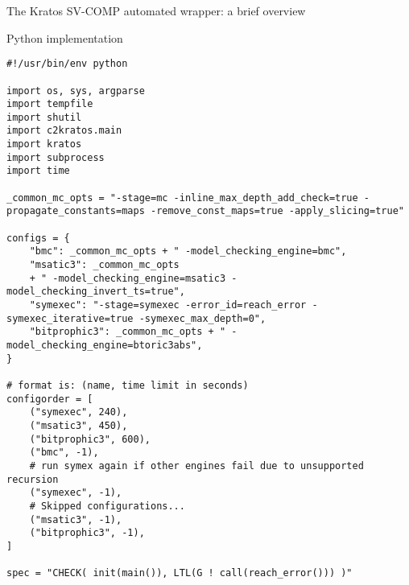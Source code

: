 \begin{frame}[fragile]{The Kratos SV-COMP automated wrapper: a brief overview}
    \begin{block}{Python implementation}
            \begin{verbatim}
#!/usr/bin/env python

import os, sys, argparse
import tempfile
import shutil
import c2kratos.main
import kratos
import subprocess
import time

_common_mc_opts = "-stage=mc -inline_max_depth_add_check=true -propagate_constants=maps -remove_const_maps=true -apply_slicing=true"

configs = {
    "bmc": _common_mc_opts + " -model_checking_engine=bmc",
    "msatic3": _common_mc_opts
    + " -model_checking_engine=msatic3 -model_checking_invert_ts=true",
    "symexec": "-stage=symexec -error_id=reach_error -symexec_iterative=true -symexec_max_depth=0",
    "bitprophic3": _common_mc_opts + " -model_checking_engine=btoric3abs",
}

# format is: (name, time limit in seconds)
configorder = [
    ("symexec", 240),
    ("msatic3", 450),
    ("bitprophic3", 600),
    ("bmc", -1),
    # run symex again if other engines fail due to unsupported recursion
    ("symexec", -1),
    # Skipped configurations...
    ("msatic3", -1),
    ("bitprophic3", -1),
]

spec = "CHECK( init(main()), LTL(G ! call(reach_error())) )"
            \end{verbatim}
    \end{block}
\end{frame}

